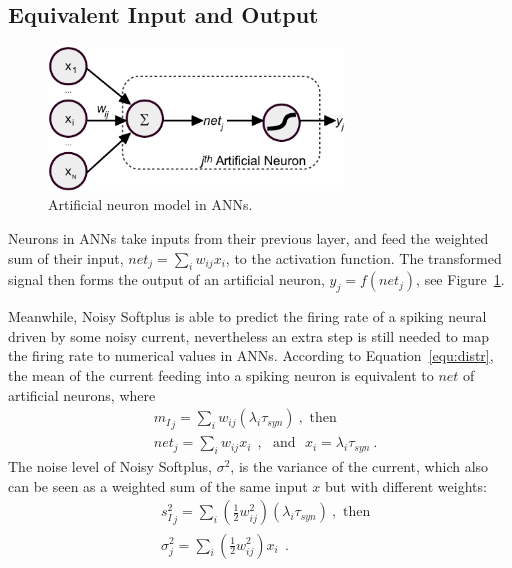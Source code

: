	\subsection{Equivalent Input and Output}
	
	\begin{figure}[bt]
		\centering
		\includegraphics[width=0.7\textwidth]{pics_iconip/neuron.pdf}
		\caption{Artificial neuron model in ANNs. }
		\label{Fig:neuron}
	\end{figure}
	Neurons in ANNs take inputs from their previous layer, and feed the weighted sum of their input, $net_j = \sum_i w_{ij}x_i$, to the activation function.
	The transformed signal then forms the output of an artificial neuron, $y_j=f(net_j)$, see Figure~\ref{Fig:neuron}.
	
	Meanwhile, Noisy Softplus is able to predict the firing rate of a spiking neural driven by some noisy current, nevertheless an extra step is still needed to map the firing rate to numerical values in ANNs.
	According to Equation~\ref{equ:distr}, the mean of the current feeding into a spiking neuron is equivalent to $net$ of artificial neurons, where
	\begin{equation}
	\begin{aligned}
		& {m_I}_j = \sum_i w_{ij}(\lambda_{i}\tau_{syn})~, \textrm{  then}\\
		& net_j= \sum_i w_{ij} x_i~~, \textrm{~~and~~}
		x_i = \lambda_{i}\tau_{syn}~.
	\end{aligned}
	\label{equ:mi_input}
	\end{equation}
	The noise level of Noisy Softplus, $\sigma^2$, is the variance of the current, which also can be seen as a weighted sum of the same input $x$ but with different weights:
	\begin{equation}
	\begin{aligned}
		& {s_I^2}_j=\sum_i(\frac{1}{2} w_{ij}^2) (\lambda_{i}\tau_{syn})~, \textrm{  then}\\
		& \sigma^2_j= \sum_i (\frac{1}{2} w_{ij}^2) x_i~~.
	\end{aligned}
	\label{equ:si_input}
	\end{equation}
	
